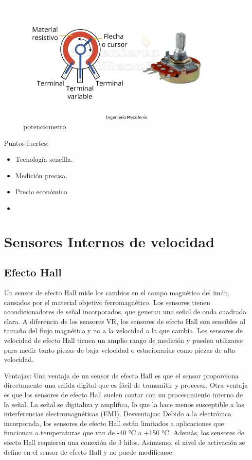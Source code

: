 \begin{figure}[h]
	\centering
	\includegraphics[width=0.7\linewidth]{img/potenciometro.jpg}
	\caption{potenciometro}
	\label{fig:insertarimagen}
\end{figure}

Puntos fuertes:

\begin{itemize}
    \item Tecnología sencilla.
    \item Medición precisa.
    \item Precio económico
    \item 
\end{itemize}

\section{Sensores Internos de velocidad}

\subsection{Efecto Hall }

Un sensor de efecto Hall mide los cambios en el campo magnético del imán, causados por el material objetivo ferromagnético. Los sensores tienen acondicionadores de señal incorporados, que generan una señal de onda cuadrada clara. A diferencia de los sensores VR, los sensores de efecto Hall son sensibles al tamaño del flujo magnético y no a la velocidad a la que cambia. Los sensores de velocidad de efecto Hall tienen un amplio rango de medición y pueden utilizarse para medir tanto piezas de baja velocidad o estacionarias como piezas de alta velocidad.

Ventajas:
Una ventaja de un sensor de efecto Hall es que el sensor proporciona directamente una salida digital que es fácil de transmitir y procesar. Otra ventaja es que los sensores de efecto Hall suelen contar con un procesamiento interno de la señal. La señal se digitaliza y amplifica, lo que la hace menos susceptible a las interferencias electromagnéticas (EMI).
Desventajas:
Debido a la electrónica incorporada, los sensores de efecto Hall están limitados a aplicaciones que funcionan a temperaturas que van de -40 °C a +150 °C. Además, los sensores de efecto Hall requieren una conexión de 3 hilos. Asimismo, el nivel de activación se define en el sensor de efecto Hall y no puede modificarse.


